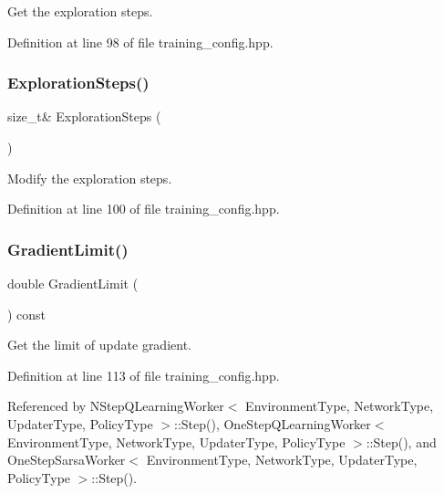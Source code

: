 Get the exploration steps. 



Definition at line 98 of file training\+\_\+config.\+hpp.

\mbox{\label{classmlpack_1_1rl_1_1TrainingConfig_afa61655c677211db7194648c2be1b0ba}} 
\subsubsection{Exploration\+Steps()\hspace{0.1cm}{\footnotesize\ttfamily [2/2]}}
{\footnotesize\ttfamily size\+\_\+t\& Exploration\+Steps (\begin{DoxyParamCaption}{ }\end{DoxyParamCaption})\hspace{0.3cm}{\ttfamily [inline]}}



Modify the exploration steps. 



Definition at line 100 of file training\+\_\+config.\+hpp.

\mbox{\label{classmlpack_1_1rl_1_1TrainingConfig_a47c21c74b98a88391e1d4acb707fb930}} 
\subsubsection{Gradient\+Limit()\hspace{0.1cm}{\footnotesize\ttfamily [1/2]}}
{\footnotesize\ttfamily double Gradient\+Limit (\begin{DoxyParamCaption}{ }\end{DoxyParamCaption}) const\hspace{0.3cm}{\ttfamily [inline]}}



Get the limit of update gradient. 



Definition at line 113 of file training\+\_\+config.\+hpp.



Referenced by N\+Step\+Q\+Learning\+Worker$<$ Environment\+Type, Network\+Type, Updater\+Type, Policy\+Type $>$\+::\+Step(), One\+Step\+Q\+Learning\+Worker$<$ Environment\+Type, Network\+Type, Updater\+Type, Policy\+Type $>$\+::\+Step(), and One\+Step\+Sarsa\+Worker$<$ Environment\+Type, Network\+Type, Updater\+Type, Policy\+Type $>$\+::\+Step().

